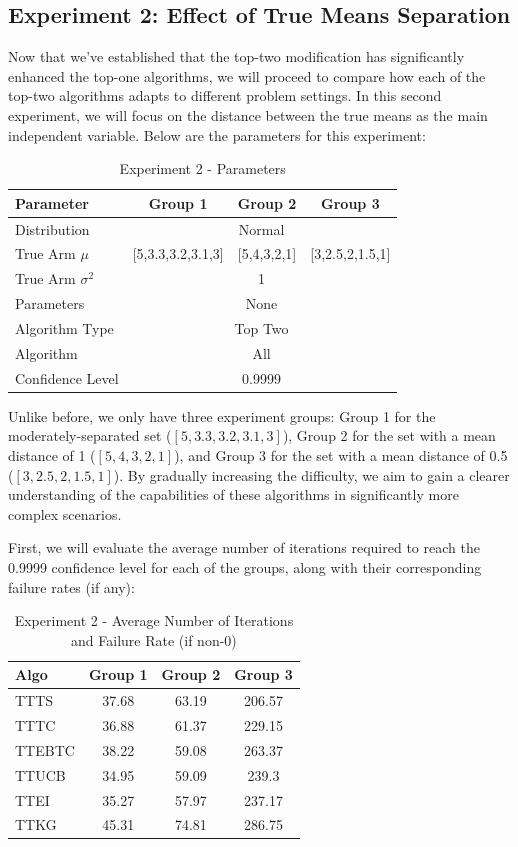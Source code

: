\documentclass[a4paper, 12pt]{article}
\theoremstyle{definition}
\begin{document}
\subsection{Experiment 2: Effect of True Means Separation}
Now that we've established that the top-two modification has significantly enhanced the top-one algorithms, we will proceed to compare how each of the top-two algorithms adapts to different problem settings. In this second experiment, we will focus on the distance between the true means as the main independent variable. Below are the parameters for this experiment:

\begin{table}[hbt!]
\centering
\begin{tabular}{lccc}
\hline
Parameter & Group 1 & Group 2 & Group 3 \\
\hline
Distribution & \multicolumn{3}{c}{Normal} \\
True Arm $\mu$ & [5,3.3,3.2,3.1,3] & [5,4,3,2,1] & [3,2.5,2,1.5,1] \\
True Arm $\sigma^2$ & \multicolumn{3}{c}{1} \\
Parameters & \multicolumn{3}{c}{None} \\
Algorithm Type & \multicolumn{3}{c}{Top Two} \\
Algorithm & \multicolumn{3}{c}{All} \\
Confidence Level & \multicolumn{3}{c}{0.9999} \\
\hline
\end{tabular}
\caption{Experiment 2 - Parameters}
\label{table:exp2_param}
\end{table}

Unlike before, we only have three experiment groups: Group 1 for the moderately-separated set ($[5,3.3,3.2,3.1,3]$), Group 2 for the set with a mean distance of 1 ($[5,4,3,2,1]$), and Group 3 for the set with a mean distance of 0.5 ($[3,2.5,2,1.5,1]$). By gradually increasing the difficulty, we aim to gain a clearer understanding of the capabilities of these algorithms in significantly more complex scenarios.

First, we will evaluate the average number of iterations required to reach the 0.9999 confidence level for each of the groups, along with their corresponding failure rates (if any):

\begin{table}[hbt!]
\centering
\begin{tabular}{lccc}
\hline
Algo & Group 1 & Group 2 & Group 3 \\
\hline
TTTS & 37.68 & 63.19 & 206.57 \\
TTTC & 36.88 & 61.37 & 229.15 \\
TTEBTC & 38.22 & 59.08 & 263.37 \\
TTUCB & 34.95 & 59.09 & 239.3 \\
TTEI & 35.27 & 57.97 & 237.17 \\
TTKG & 45.31 & 74.81 & 286.75 \\
\hline
\end{tabular}
\caption{Experiment 2 - Average Number of Iterations and Failure Rate (if non-0)}
\label{table:exp2_iter}
\end{table}
\end{document}
